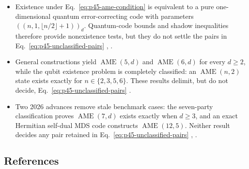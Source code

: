 \begin{itemize}
  \item Existence under Eq.~\eqref{eq:p45-ame-condition} is equivalent to a
  pure one-dimensional quantum error-correcting code with parameters
  $((n,1,\lfloor n/2\rfloor+1))_d$.  Quantum-code bounds and shadow
  inequalities therefore provide nonexistence tests, but they do not settle
  the pairs in Eq.~\eqref{eq:p45-unclassified-pairs}
  ,
  .

  \item General constructions yield $\operatorname{AME}(5,d)$ and
  $\operatorname{AME}(6,d)$ for every $d\geq2$, while the qubit existence
  problem is completely classified: an $\operatorname{AME}(n,2)$ state
  exists exactly for $n\in\{2,3,5,6\}$.  These results delimit, but do not
  decide, Eq.~\eqref{eq:p45-unclassified-pairs}
  .

  \item Two 2026 advances remove stale benchmark cases: the seven-party
  classification proves $\operatorname{AME}(7,d)$ exists exactly when
  $d\geq3$, and an exact Hermitian self-dual MDS code constructs
  $\operatorname{AME}(12,5)$.  Neither result decides any pair retained in
  Eq.~\eqref{eq:p45-unclassified-pairs}
  ,
  .
\end{itemize}

\subsection*{References}

